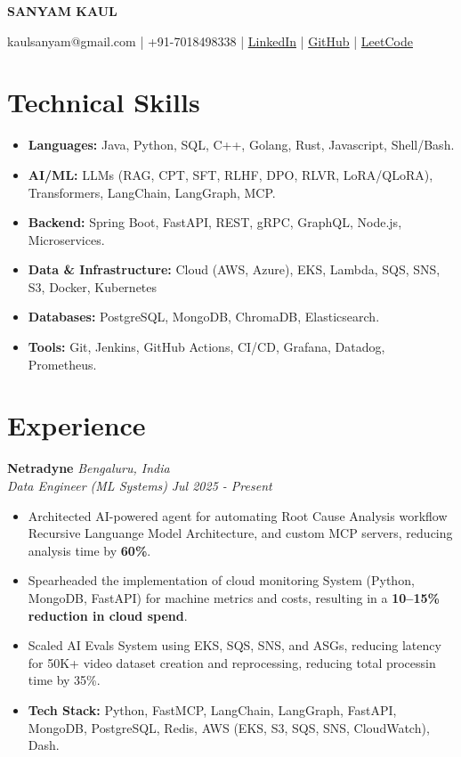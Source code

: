\documentclass[9pt,a4paper]{extarticle}
\newcommand{\resumeItem}[1]{\item\small{#1}}
\newcommand{\resumeHeading}[4]{
  \vspace{3pt}
  \textbf{#1} \hfill \textit{#2} \\[2pt]
  \textit{#3} \hfill \textit{#4} \\[1pt]
}
\begin{document}
\begin{center}
    {\Huge\bfseries SANYAM KAUL} \\ \vspace{3pt}
    
    \small
    kaulsanyam@gmail.com \quad | \quad +91-7018498338 \quad | \quad \href{https://www.linkedin.com/in/kaulmesanyam/}{LinkedIn} \quad | \quad \href{https://github.com/kaulmesanyam/}{GitHub} \quad | \quad \href{https://leetcode.com/u/kaulmesanyam/}{LeetCode}
\end{center}

\section{Technical Skills}
\begin{itemize}[leftmargin=*, nosep]
    \item \textbf{Languages:} Java, Python, SQL, C++, Golang, Rust, Javascript, Shell/Bash.
    \item \textbf{AI/ML:} LLMs (RAG, CPT, SFT, RLHF, DPO, RLVR, LoRA/QLoRA), Transformers, LangChain, LangGraph, MCP.
    \item \textbf{Backend:} Spring Boot, FastAPI, REST, gRPC, GraphQL, Node.js, Microservices.
    \item \textbf{Data \& Infrastructure:} Cloud (AWS, Azure), EKS, Lambda, SQS, SNS, S3, Docker, Kubernetes
    \item \textbf{Databases:} PostgreSQL, MongoDB, ChromaDB, Elasticsearch.
    \item \textbf{Tools:} Git, Jenkins, GitHub Actions, CI/CD, Grafana, Datadog, Prometheus.
\end{itemize}

\section{Experience}

\resumeHeading{Netradyne}{Bengaluru, India}{Data Engineer (ML Systems)}{Jul 2025 - Present}
\begin{itemize}[leftmargin=*, nosep]
    \resumeItem{Architected AI-powered agent for automating Root Cause Analysis workflow Recursive Languange Model Architecture, and custom MCP servers, reducing analysis time by \textbf{60\%}.}
    \resumeItem{Spearheaded the implementation of cloud monitoring System (Python, MongoDB, FastAPI) for machine metrics and costs, resulting in a \textbf{10--15\% reduction in cloud spend}.}
    \resumeItem{Scaled AI Evals System using EKS, SQS, SNS, and ASGs, reducing latency for 50K+ video dataset creation and reprocessing, reducing total processin time by 35\%.}
    \resumeItem{\textbf{Tech Stack:} Python, FastMCP, LangChain, LangGraph, FastAPI, MongoDB, PostgreSQL, Redis, AWS (EKS, S3, SQS, SNS, CloudWatch), Dash.}
\end{itemize}
\end{document}
